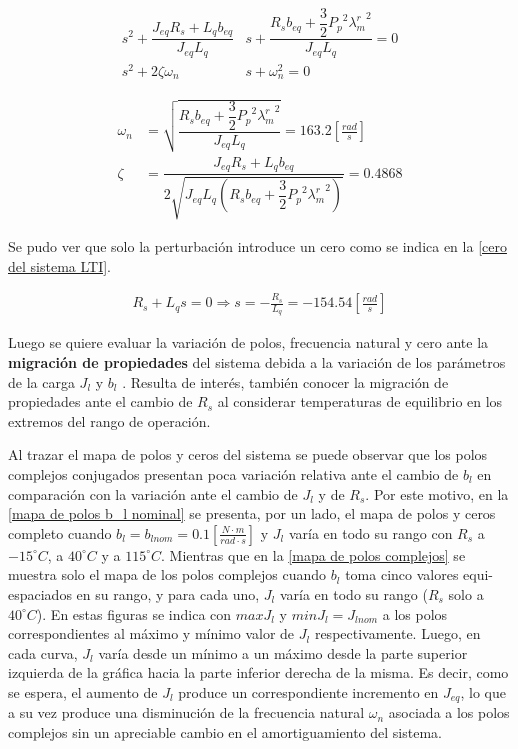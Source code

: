 \documentclass[a4paper, 10pt, onecolumn,journal]{ieeeconf}
\begin{document}
\begin{align}
	s^2 +\dfrac{ J_{eq} R_{s} + L_{q} b_{eq}}{J_{eq} L_{q}} &s +\dfrac{ R_{s} b_{eq} + \dfrac{3}{2} {P_{p}}^2 { \lambda^r_m}^2}{J_{eq} L_{q}}  = 0 \label{polinomio caracteristico del sistema LTI polos complejos conjugados}\\
	s^2 + 2 \zeta \omega_{n} &s + \omega_{n}^{2} = 0 \label{ecuación estandar de un sistema de segundo orden}
\end{align}

\begin{align}
	\omega_{n} &= \sqrt{\dfrac{ R_{s} b_{eq} + \dfrac{3}{2} {P_{p}}^2 { \lambda^r_m}^2}{J_{eq} L_{q}}} = 163.2 \left[\frac{rad}{s}\right] \label{ecuacion de las frecuencias naturales del LTI}\\
	\zeta &= \dfrac{ J_{eq} R_{s} + L_{q} b_{eq}}{2 \sqrt{ J_{eq} L_{q}\left( R_{s} b_{eq} + \dfrac{3}{2} {P_{p}}^2 { \lambda^r_m}^2\right) }} = 0.4868 \label{ecuacion de las relaciones de amortiguamiento del LTI}
\end{align}

Se pudo ver que solo la perturbación introduce un cero como se indica en la \cref{cero del sistema LTI}.

\begin{align}
	R_{s} + L_{q} s = 0 \Rightarrow s = -\frac{R_{s}}{L_{q}} = -154.54 \left[\frac{rad}{s}\right]
	\label{cero del sistema LTI}
\end{align}


Luego se quiere evaluar la variación de  polos, frecuencia natural y  cero ante la 
\textbf{migración de propiedades} del sistema debida a la variación de los parámetros de la carga
$J_l$ y $b_l$ \cite{c1}. Resulta de interés, también conocer la migración
de propiedades ante el cambio de $R_s$ al considerar temperaturas de equilibrio en los extremos del rango de operación.

Al trazar el mapa de polos y ceros del sistema se puede observar que
los polos complejos conjugados presentan poca variación relativa ante el cambio de $b_l$ en comparación con la variación ante el cambio de $J_l$ y de $R_s$.
Por este motivo, en la \cref{mapa de polos b_l nominal} se presenta, por un lado, el mapa de polos y ceros completo cuando
$b_l = b_{lnom} = 0.1 \left[\frac{N \cdot m}{rad \cdot s}\right]$ y $J_l$ varía en todo su rango con $R_s$ a $-15^\circ C$, a $40^\circ C$ y a $115^\circ C$. Mientras que en la
\cref{mapa de polos complejos} se muestra solo el mapa de los polos complejos cuando
$b_l$ toma cinco valores equi-espaciados en su rango, y para cada uno, $J_l$ varía en todo su rango ($R_s$ solo a $40^\circ C$).
En estas figuras se indica con $max J_{l}$ y $min J_{l} = J_{lnom}$ a los polos correspondientes al máximo y mínimo valor
de $J_{l}$ respectivamente. Luego, en cada curva, $J_l$ varía desde un mínimo a un máximo
desde la parte superior izquierda de la gráfica hacia la parte inferior derecha de la misma. Es decir, como se espera, 
el aumento de $J_{l}$  produce un correspondiente incremento en $J_{eq}$,
lo que a su vez produce una disminución de la frecuencia natural $\omega_n$ asociada a los polos complejos sin un apreciable
cambio en el amortiguamiento del sistema.
\end{document}

